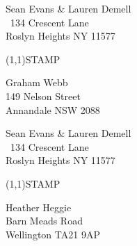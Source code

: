 \documentclass[12pt]{article}
\begin{document}
\clearpage

\begin{minipage}{.5\linewidth} \noindent
Sean Evans \& Lauren Demell\\\ 
134 Crescent Lane\\ 
Roslyn Heights NY 11577
\end{minipage}
\begin{minipage}{.5\linewidth \hspace{-.2in} \vspace{-.3in}}
\begin{flushright}
\framebox(1,1){STAMP}
\end{flushright}
\end{minipage}

\begin{center} \begin{Huge} \vspace*{\fill}
Graham Webb\\
149 Nelson Street\\
Annandale NSW 2088\\
\vspace{\fill} \end{Huge} \end{center}

\clearpage

\begin{minipage}{.5\linewidth} \noindent
Sean Evans \& Lauren Demell\\\ 
134 Crescent Lane\\ 
Roslyn Heights NY 11577
\end{minipage}
\begin{minipage}{.5\linewidth \hspace{-.2in} \vspace{-.3in}}
\begin{flushright}
\framebox(1,1){STAMP}
\end{flushright}
\end{minipage}

\begin{center} \begin{Huge} \vspace*{\fill}
Heather Heggie\\
Barn Meads Road\\
Wellington TA21 9AP\\
\vspace{\fill} \end{Huge} \end{center}
\end{document}
